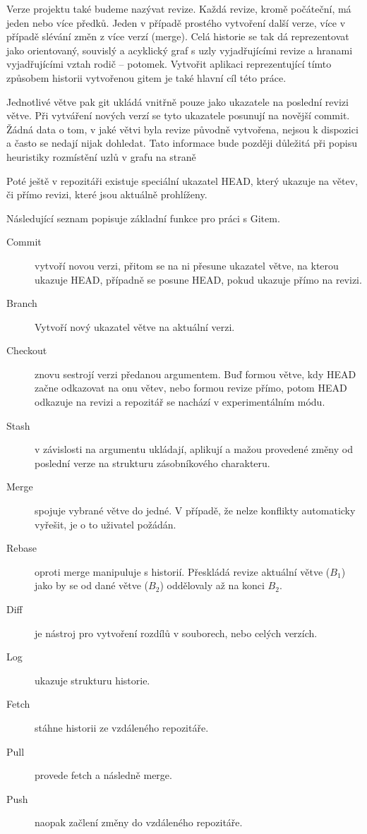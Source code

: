 \documentclass[
  biblatex,
  glossaries,
  index
]{kidiplom}
\begin{document}
Verze projektu také budeme nazývat revize. Každá revize, kromě počáteční, má jeden nebo více předků. Jeden v případě prostého vytvoření další verze, více v případě slévání změn z více verzí (merge). Celá historie se tak dá reprezentovat jako orientovaný, souvislý a acyklický graf s uzly vyjadřujícími revize a hranami vyjadřujícími vztah rodič -- potomek. Vytvořit aplikaci reprezentující tímto způsobem historii vytvořenou gitem je také hlavní cíl této práce.

Jednotlivé větve pak git ukládá vnitřně pouze jako ukazatele na poslední revizi větve. Při vytváření nových verzí se tyto ukazatele posunují na novější commit. Žádná data o tom, v jaké větvi byla revize původně vytvořena, nejsou k dispozici a často se nedají nijak dohledat. Tato informace bude později důležitá při popisu heuristiky rozmístění uzlů v grafu na straně \pageref{subsec:algorithm}

Poté ještě v repozitáři existuje speciální ukazatel HEAD, který ukazuje na větev, či přímo revizi, které jsou aktuálně prohlíženy.

Následující seznam popisuje základní funkce pro práci s Gitem.

\begin{description}
  \item[Commit]  vytvoří novou verzi, přitom se na ni přesune ukazatel větve, na kterou ukazuje HEAD, případně se posune HEAD, pokud ukazuje přímo na revizi.
  \item[Branch] Vytvoří nový ukazatel větve na aktuální verzi.
  \item[Checkout] znovu sestrojí verzi předanou argumentem. Buď formou větve, kdy HEAD začne odkazovat na onu větev, nebo formou revize přímo, potom HEAD odkazuje na revizi a repozitář se nachází v experimentálním módu.
  \item[Stash] v závislosti na argumentu ukládají, aplikují a mažou provedené změny od poslední verze na strukturu zásobníkového charakteru.
  \item[Merge] spojuje vybrané větve do jedné. V případě, že nelze konflikty automaticky vyřešit, je o to uživatel požádán.
  \item[Rebase] oproti merge manipuluje s historií. Přeskládá revize aktuální větve ($B_1$) jako by se od dané větve ($B_2$) oddělovaly až na konci $B_2$.
  \item[Diff] je nástroj pro vytvoření rozdílů v souborech, nebo celých verzích.
  \item[Log] ukazuje strukturu historie.
  \item[Fetch] stáhne historii ze vzdáleného repozitáře.
  \item[Pull] provede fetch a následně merge.
  \item[Push] naopak začlení změny do vzdáleného repozitáře.
\end{description}
\end{document}
